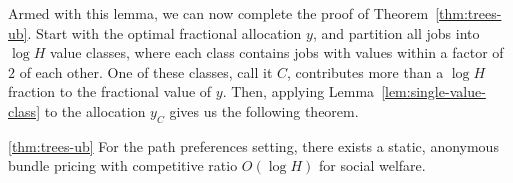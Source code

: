 

Armed with this lemma, we can now complete the proof of
Theorem~\ref{thm:trees-ub}. Start with the optimal fractional
allocation $y$, and partition all jobs into $\log H$ value classes,
where each class contains jobs with values within a factor of $2$ of
each other. One of these classes, call it $C$, contributes more than a
$\log H$ fraction to the fractional value of $y$. Then, applying
Lemma~\ref{lem:single-value-class} to the allocation $y_C$ gives
us the following theorem.

\begin{numberedtheorem}{\ref{thm:trees-ub}}
For the path preferences setting, there exists a static, anonymous bundle
pricing with competitive ratio $O\left(\log H\right)$ for social welfare.
\end{numberedtheorem}
